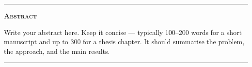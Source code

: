 
\begin{center}
    \rule{0.5\textwidth}{0.4pt}       %
    \vspace{0.4em}

    {\small\bfseries\scshape Abstract}

    \vspace{0.4em}

    \begin{minipage}{0.85\textwidth}
        \small\noindent
        Write your abstract here. Keep it concise — typically 100--200 words
        for a short manuscript and up to 300 for a thesis chapter. It should
        summarise the problem, the approach, and the main results.
    \end{minipage}

    \vspace{0.4em}
    \rule{0.5\textwidth}{0.4pt}       %
\end{center}

\vspace{1em}
